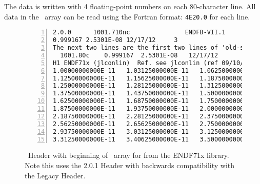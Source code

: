 The data is written with \num{4} floating-point numbers on each 80-character line.  All data in the \XSS\ array can be read using the Fortran format: \texttt{4E20.0} for each line.

\begin{figure}[h!] \centering
\begin{Verbatim}[frame=single,fontsize=\footnotesize,numbers=left, numbersep=2pt]
2.0.0      1001.710nc               ENDFB-VII.1             
0.999167 2.5301E-08 12/17/12     3
The next two lines are the first two lines of 'old-style' ACE.
  1001.80c    0.999167  2.5301E-08   12/17/12
H1 ENDF71x (jlconlin)  Ref. see jlconlin (ref 09/10/2012  10:00:53)      mat 125
1.00000000000E-11   1.03125000000E-11   1.06250000000E-11   1.09375000000E-11
1.12500000000E-11   1.15625000000E-11   1.18750000000E-11   1.21875000000E-11
1.25000000000E-11   1.28125000000E-11   1.31250000000E-11   1.34375000000E-11
1.37500000000E-11   1.43750000000E-11   1.50000000000E-11   1.56250000000E-11
1.62500000000E-11   1.68750000000E-11   1.75000000000E-11   1.81250000000E-11
1.87500000000E-11   1.93750000000E-11   2.00000000000E-11   2.09375000000E-11
2.18750000000E-11   2.28125000000E-11   2.37500000000E-11   2.46875000000E-11
2.56250000000E-11   2.65625000000E-11   2.75000000000E-11   2.84375000000E-11
2.93750000000E-11   3.03125000000E-11   3.12500000000E-11   3.21875000000E-11
3.31250000000E-11   3.40625000000E-11   3.50000000000E-11   3.59375000000E-11
\end{Verbatim}
\caption{\ACE\ Header with beginning of \XSS\ array for  from the ENDF71x library. Note this uses the 2.0.1 Header with backwards compatibility with the Legacy Header.}
  \label{fig:XSSExample}
\end{figure}

